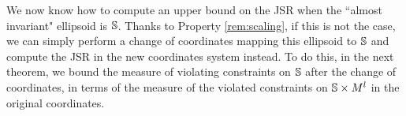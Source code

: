 %

We now know how to compute an upper bound on the JSR when the ``almost invariant" ellipsoid is $\mathbb{S}$. Thanks to Property \ref{rem:scaling}, if this is not the case, we can simply perform a change of coordinates mapping this ellipsoid to $\mathbb{S}$ and compute the JSR in the new coordinates system instead. To do this, in the next theorem, we bound the measure of violating constraints on $\mathbb{S}$ after the change of coordinates, in terms of the measure of the violated constraints on $\mathbb{S} \times M^l$ in the original coordinates.

